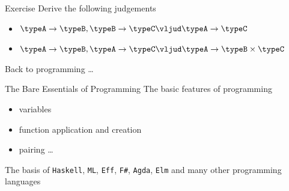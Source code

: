 \documentclass{beamer}
\begin{document}
\begin{frame}{Exercise}
  Derive the following judgements
  \begin{itemize}
          \item $\typeA \to \typeB,\typeB \to \typeC \vljud \typeA \to \typeC$ 
          \item $\typeA \to \typeB,\typeA \to \typeC \vljud \typeA \to \typeB
                  \times \typeC$
  \end{itemize}        
\end{frame}

\begin{frame}[plain]

        \begin{center}
                Back to programming \dots
        \end{center}
\end{frame}
%
\begin{frame}{The Bare Essentials of Programming}
  The \alert{basic features} of programming
  \begin{itemize}
  \item variables  
  \item function application and creation
  \item pairing \dots
  \end{itemize}
  \bigskip
  \begin{center}
  \end{center}
  \pause
  The basis of \alert{\texttt{Haskell}}, \texttt{ML},
  \texttt{Eff}, \texttt{F\#}, \texttt{Agda}, \texttt{Elm} and many
  other programming languages
\end{frame}
%
\end{document}
